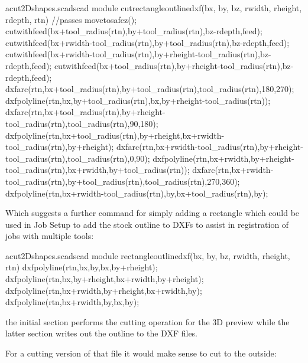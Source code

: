 \documentclass{ltxdoc}
\begin{document}
\lstset{firstnumber=\thecuttwod}
\begin{writecode}{a}{cut2Dshapes.scad}{scad}
module cutrectangleoutlinedxf(bx, by, bz, rwidth, rheight, rdepth, rtn) {//passes
  movetosafez();
  cutwithfeed(bx+tool_radius(rtn),by+tool_radius(rtn),bz-rdepth,feed);
  cutwithfeed(bx+rwidth-tool_radius(rtn),by+tool_radius(rtn),bz-rdepth,feed);
  cutwithfeed(bx+rwidth-tool_radius(rtn),by+rheight-tool_radius(rtn),bz-rdepth,feed);
  cutwithfeed(bx+tool_radius(rtn),by+rheight-tool_radius(rtn),bz-rdepth,feed);
  dxfarc(rtn,bx+tool_radius(rtn),by+tool_radius(rtn),tool_radius(rtn),180,270);
  dxfpolyline(rtn,bx,by+tool_radius(rtn),bx,by+rheight-tool_radius(rtn));
  dxfarc(rtn,bx+tool_radius(rtn),by+rheight-tool_radius(rtn),tool_radius(rtn),90,180);
  dxfpolyline(rtn,bx+tool_radius(rtn),by+rheight,bx+rwidth-tool_radius(rtn),by+rheight);
  dxfarc(rtn,bx+rwidth-tool_radius(rtn),by+rheight-tool_radius(rtn),tool_radius(rtn),0,90);
  dxfpolyline(rtn,bx+rwidth,by+rheight-tool_radius(rtn),bx+rwidth,by+tool_radius(rtn));
  dxfarc(rtn,bx+rwidth-tool_radius(rtn),by+tool_radius(rtn),tool_radius(rtn),270,360);
  dxfpolyline(rtn,bx+rwidth-tool_radius(rtn),by,bx+tool_radius(rtn),by);
}

\end{writecode}
\addtocounter{cuttwod}{16}

%
Which suggests a further command for simply adding a rectangle which could be used in
Job Setup to add the stock outline to DXFs to assist in registration of jobs with
multiple tools:

\lstset{firstnumber=\thecuttwod}
\begin{writecode}{a}{cut2Dshapes.scad}{scad}
module rectangleoutlinedxf(bx, by, bz, rwidth, rheight, rtn) {
  dxfpolyline(rtn,bx,by,bx,by+rheight);
  dxfpolyline(rtn,bx,by+rheight,bx+rwidth,by+rheight);
  dxfpolyline(rtn,bx+rwidth,by+rheight,bx+rwidth,by);
  dxfpolyline(rtn,bx+rwidth,by,bx,by);
}

\end{writecode}
\addtocounter{cuttwod}{7}

\noindent the initial section performs the cutting operation for the 3D preview while the 
latter section writes out the outline to the DXF files.

%
For a cutting version of that file it would make sense to cut to the outside:
\end{document}

